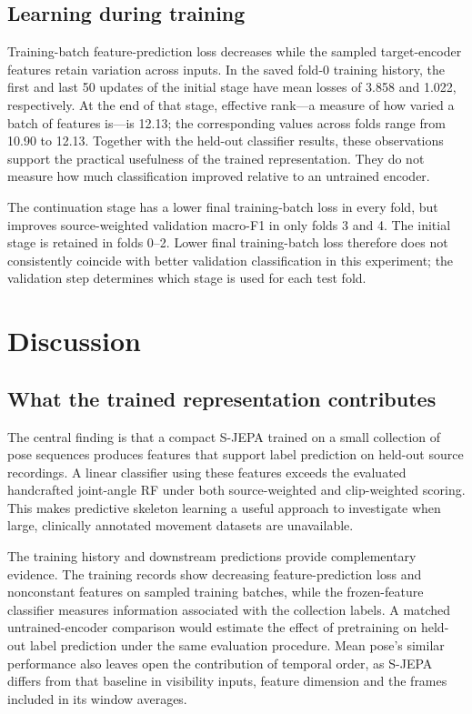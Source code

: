 \documentclass[10pt,twocolumn,letterpaper]{article}
\begin{document}
\subsection{Learning during training}
Training-batch feature-prediction loss decreases while the sampled target-encoder features retain variation across inputs. In the saved fold-0 training history, the first and last 50 updates of the initial stage have mean losses of 3.858 and 1.022, respectively. At the end of that stage, effective rank---a measure of how varied a batch of features is---is 12.13; the corresponding values across folds range from 10.90 to 12.13. Together with the held-out classifier results, these observations support the practical usefulness of the trained representation. They do not measure how much classification improved relative to an untrained encoder.

The continuation stage has a lower final training-batch loss in every fold, but improves source-weighted validation macro-F1 in only folds 3 and 4. The initial stage is retained in folds 0--2. Lower final training-batch loss therefore does not consistently coincide with better validation classification in this experiment; the validation step determines which stage is used for each test fold.




\section{Discussion}
\subsection{What the trained representation contributes}
The central finding is that a compact S-JEPA trained on a small collection of pose sequences produces features that support label prediction on held-out source recordings. A linear classifier using these features exceeds the evaluated handcrafted joint-angle RF under both source-weighted and clip-weighted scoring. This makes predictive skeleton learning a useful approach to investigate when large, clinically annotated movement datasets are unavailable.

The training history and downstream predictions provide complementary evidence. The training records show decreasing feature-prediction loss and nonconstant features on sampled training batches, while the frozen-feature classifier measures information associated with the collection labels. A matched untrained-encoder comparison would estimate the effect of pretraining on held-out label prediction under the same evaluation procedure. Mean pose's similar performance also leaves open the contribution of temporal order, as S-JEPA differs from that baseline in visibility inputs, feature dimension and the frames included in its window averages.
\end{document}
